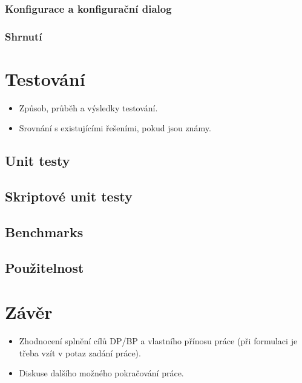 \documentclass[11pt,twoside,a4paper]{book}
\begin{document}
\subsection{Konfigurace a konfigurační dialog}

\subsection{Shrnutí}




\chapter{Testování}

\begin{itemize}
 \item Způsob, průběh a výsledky testování.
 \item Srovnání s existujícími řešeními, pokud jsou známy.
\end{itemize}

\section{Unit testy}
\label{unit_testy}

\section{Skriptové unit testy}

\section{Benchmarks}

\section{Použitelnost}



\chapter{Závěr}

\begin{itemize}
\item Zhodnocení splnění cílů DP/BP a  vlastního přínosu práce (při formulaci je třeba vzít v potaz zadání práce).
\item Diskuse dalšího možného pokračování práce.
\end{itemize}
\end{document}
